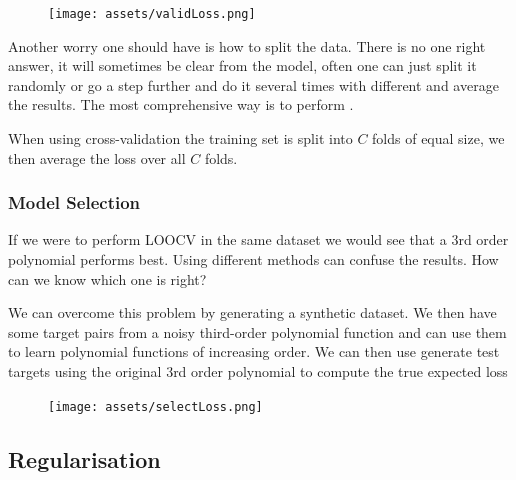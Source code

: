 		\begin{figure}[ht]
		\centering
		\texttt{[image: assets/validLoss.png]}
		\end{figure}

		\par{Another worry one should have is how to split the data. There is no one right answer, it will sometimes be clear from the model, often one can just split it randomly or go a step further and do it several times with different and average the results. The most comprehensive way is to perform .}


		\par{When using  cross-validation the training set is split into $C$  folds of equal size, we then average the loss over all $C$ folds.}



		\subsubsection{Model Selection}

		\par{If we were to perform LOOCV in the same dataset we would see that a 3rd order polynomial performs best. Using different methods can confuse the results. How can we know which one is right?}

		\par{We can overcome this problem by generating a synthetic dataset. We then have some target pairs from a noisy third-order polynomial function and can use them to learn polynomial functions of increasing order. We can then use generate test targets using the original 3rd order polynomial to compute the true expected loss}

		\begin{figure}[ht]
		\centering
		\texttt{[image: assets/selectLoss.png]}
		\end{figure}

		
		\subsection{Regularisation}










